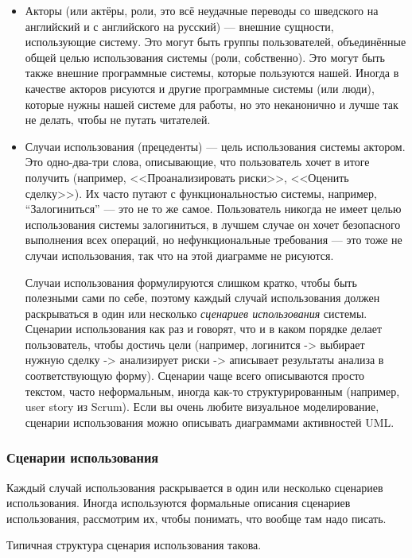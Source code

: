 \documentclass[a5paper]{article}
\begin{document}
\begin{itemize}
	\item Акторы (или актёры, роли, это всё неудачные переводы со шведского на английский и с английского на русский) --- внешние сущности, использующие систему. Это могут быть группы пользователей, объединённые общей целью использования системы (роли, собственно). Это могут быть также внешние программные системы, которые пользуются нашей. Иногда в качестве акторов рисуются и другие программные системы (или люди), которые нужны нашей системе для работы, но это неканонично и лучше так не делать, чтобы не путать читателей.
	\item Случаи использования (прецеденты)  --- цель использования системы актором. Это одно-два-три слова, описывающие, что пользователь хочет в итоге получить (например, <<Проанализировать риски>>, <<Оценить сделку>>). Их часто путают с функциональностью системы, например, ``Залогиниться'' --- это не то же самое. Пользователь никогда не имеет целью использования системы залогиниться, в лучшем случае он хочет безопасного выполнения всех операций, но нефункциональные требования --- это тоже не случаи использования, так что на этой диаграмме не рисуются.

	Случаи использования формулируются слишком кратко, чтобы быть полезными сами по себе, поэтому каждый случай использования должен раскрываться в один или несколько \textit{сценариев использования} системы. Сценарии использования как раз и говорят, что и в каком порядке делает пользователь, чтобы достичь цели (например, логинится -> выбирает нужную сделку -> анализирует риски -> аписывает результаты анализа в соответствующую форму). Сценарии чаще всего описываются просто текстом, часто неформальным, иногда как-то структурированным (например, user story из Scrum). Если вы очень любите визуальное моделирование, сценарии использования можно описывать диаграммами активностей UML.
\end{itemize}

\subsubsection{Сценарии использования}

Каждый случай использования раскрывается в один или несколько сценариев использования. Иногда используются формальные описания сценариев использования, рассмотрим их, чтобы понимать, что вообще там надо писать.

Типичная структура сценария использования такова.
\end{document}
